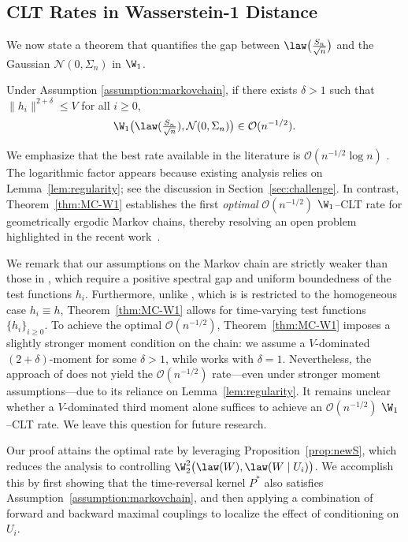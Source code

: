 \documentclass[mnsc,nonblindrev]{informs3}
\begin{document}
\subsection{CLT Rates in Wasserstein-1 Distance}
We now state a theorem that quantifies the gap between
\(\law\big(\tfrac{S_n}{\sqrt{n}}\big)\) and the Gaussian  \(\mathcal N(0,\Sigma_n)\) in $\W_1$.
\begin{theorem}
\label{thm:MC-W1}
Under Assumption \ref{assumption:markovchain},  if there exists $\delta>1$ such that $\|h_i\|^{2+\delta} \leq V$ for all $i \geq 0$,
    \begin{align*}
       \W_{1}\bigl(\law(\tfrac{S_n}{\sqrt{n}}),\mathcal N(0,\Sigma_n)\bigr) \in \mathcal{O}(n^{-1/2}).
    \end{align*} 
\end{theorem}
We emphasize that the best rate available in the literature is
$\mathcal O(n^{-1/2}\log n)$ \citep{srikant2024rates,wu2025uncertainty}. The
logarithmic factor appears because existing analysis relies on Lemma~\ref{lem:regularity}; see the discussion in Section~\ref{sec:challenge}.
In contrast, Theorem~\ref{thm:MC-W1} establishes the first \emph{optimal}
$\mathcal O(n^{-1/2})$ $\W_1$--CLT rate for geometrically ergodic Markov chains,
thereby resolving an open problem highlighted in the recent work~\citep{srikant2024rates}. 

We remark that our assumptions on the Markov chain are strictly weaker than those in
\cite{wu2025uncertainty}, which require a positive spectral gap and uniform boundedness of the
test functions $h_i$. Furthermore, unlike \cite{srikant2024rates}, which is is restricted to the homogeneous
case $h_i \equiv h$, Theorem~\ref{thm:MC-W1} allows for time-varying test
functions $\{h_i\}_{i\ge 0}$. To achieve the optimal $\mathcal O(n^{-1/2})$, Theorem~\ref{thm:MC-W1} imposes a slightly stronger
moment condition on the chain: we assume a $V$-dominated $(2+\delta)$-moment for some
$\delta>1$, while \cite{srikant2024rates} works with $\delta=1$.
 Nevertheless, the approach of \cite{srikant2024rates} does not yield the
$\mathcal O(n^{-1/2})$ rate---even under stronger moment assumptions---due to
its reliance on Lemma~\ref{lem:regularity}.
It remains unclear whether a $V$-dominated third moment alone suffices to
achieve an $\mathcal O(n^{-1/2})$ $\W_1$--CLT rate. We leave this question for
future research.

Our proof attains the optimal rate by leveraging Proposition~\ref{prop:newS}, which reduces the
analysis to controlling $\W_2^2\bigl(\law(W),\law(W\mid U_i)\bigr)$.
 We accomplish this by first
showing that the time-reversal kernel $P^*$ also satisfies
Assumption~\ref{assumption:markovchain}, and then applying a combination of
forward and backward maximal couplings to localize the effect of conditioning
on $U_i$.
\end{document}
